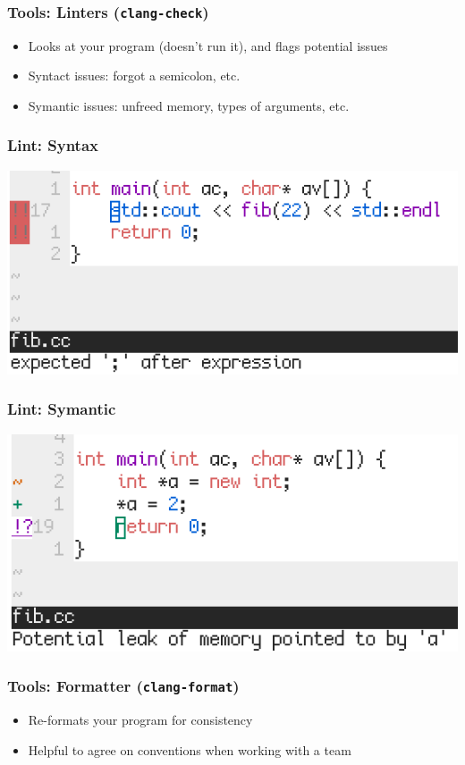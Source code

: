 \documentclass{beamer} \usetheme{Madrid}
\begin{document}
\begin{frame}
	\frametitle{Tools: Linters (\texttt{clang-check})}
	\begin{itemize}
		\item Looks at your program (doesn't run it), and flags potential issues
		\item Syntact issues: forgot a semicolon, etc.
		\item Symantic issues: unfreed memory, types of arguments, etc.
	\end{itemize}
\end{frame}

\begin{frame}
	\frametitle{Lint: Syntax}
	\includegraphics[width=\textwidth]{lint_syntax.png}
\end{frame}

\begin{frame}
	\frametitle{Lint: Symantic}
	\includegraphics[width=\textwidth]{lint_symantic.png}
\end{frame}

\begin{frame}[fragile]
	\frametitle{Tools: Formatter (\texttt{clang-format})}
	\begin{itemize}
		\item Re-formats your program for consistency
		\item Helpful to agree on conventions when working with a team
	\end{itemize}
\end{frame}
\end{document}
